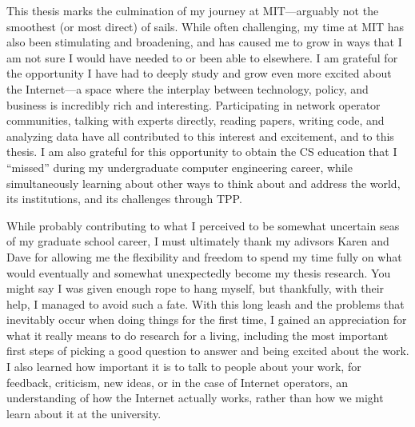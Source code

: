This thesis marks the culmination of my journey at MIT---arguably not the
smoothest (or most direct) of sails. While often challenging, my time at MIT
has also been stimulating and broadening, and has caused me to grow in ways
that I am not sure I would have needed to or been able to elsewhere. I am
grateful for the opportunity I have had to deeply study and grow even more
excited about the Internet---a space where the interplay between technology,
policy, and business is incredibly rich and interesting. Participating in
network operator communities, talking with experts directly, reading papers,
writing code, and analyzing data have all contributed to this interest and
excitement, and to this thesis. I am also grateful for this opportunity to
obtain the CS education that I ``missed'' during my undergraduate computer
engineering career, while simultaneously learning about other ways to think
about and address the world, its institutions, and its challenges through TPP.

While probably contributing to what I perceived to be somewhat uncertain seas
of my graduate school career, I must ultimately thank my adivsors Karen and
Dave for allowing me the flexibility and freedom to spend my time fully on what
would eventually and somewhat unexpectedly become my thesis research. You might
say I was given enough rope to hang myself, but thankfully, with their help, I
managed to avoid such a fate. With this long leash and the problems that
inevitably occur when doing things for the first time, I gained an appreciation
for what it really means to do research for a living, including the most
important first steps of picking a good question to answer and being excited
about the work. I also learned how important it is to talk to people about your
work, for feedback, criticism, new ideas, or in the case of Internet operators,
an understanding of how the Internet actually works, rather than how we might
learn about it at the university.

%


